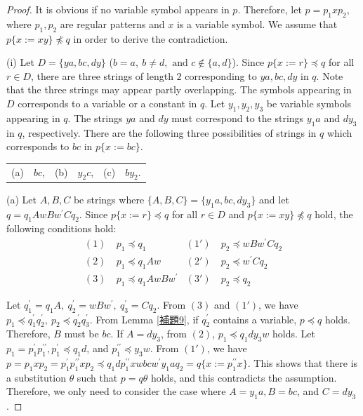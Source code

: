 \begin{proof}
  It is obvious if no variable symbol appears in $p$.
  Therefore, let $p=p_{1}xp_{2}$, where $p_{1}, p_{2}$ are regular patterns and $x$ is a variable symbol. We assume that $p \{ x := xy \} \not \preceq q$ in order to derive the contradiction.
  
\noindent\textrm{(i)}
Let $D=\{ ya, bc, dy \}$ ($b = a,~b \not= d,\mbox{~and~}c \not\in \{a,d\}$).
Since $p \{ x := r \} \preceq q$ for all $r \in D$, there are three strings of length $2$ corresponding to $ya, bc, dy$ in $q$. Note that the three strings may appear partly overlapping.
The symbols appearing in $D$ corresponds to a variable or a constant in $q$.
Let $y_{1}, y_{2}, y_{3}$ be variable symbols appearing in $q$.
The strings $ya$ and $dy$ must correspond to the strings $y_{1}a$ and $dy_{3}$ in $q$, respectively.
There are the following three possibilities of strings in $q$ which corresponds to $bc$ in $p\{x:=bc\}$.
\begin{center}
\begin{tabular}{cccccc}
\textrm{(a)} & $bc$, &
\textrm{(b)} & $y_{2}c$, &
\textrm{(c)} & $by_{2}$.
\end{tabular}
\end{center}

\textrm{(a)}
Let $A,B,C$ be strings where $\{ A,B,C \} = \{ y_{1}a,bc,dy_{3} \}$ and let $q=q_{1}AwBw^{\prime}Cq_{2}$.
Since $p \{ x := r \} \preceq q$ for all $r \in D$ and $p \{ x := xy \} \not \preceq q$ hold, the following conditions hold:
\begin{align*}
(1)~& p_{1} \preceq q_{1} & (1')~& p_{2} \preceq wBw^{\prime}Cq_{2} \\
(2)~& p_{1} \preceq q_{1}Aw & (2')~& p_{2} \preceq w^{\prime}Cq_{2} \\
(3)~& p_{1} \preceq q_{1}AwBw^{\prime} & (3')~& p_{2} \preceq q_{2}
\end{align*}

Let $q^{\prime}_{1}=q_{1}A,~q^{\prime}_{2}=wBw^{\prime},~q^{\prime}_{3}=Cq_{2}$. From $(3)$ and $(1')$, we have $p_{1} \preceq q^{\prime}_{1}q^{\prime}_{2},~p_{2} \preceq q^{\prime}_{2}q^{\prime}_{3}$.
From Lemma \ref{補題9}, if $q^{\prime}_{2}$ contains a variable, $p \preceq q$ holds.
Therefore, $B$ must be $bc$.
If $A=dy_{3}$, from $(2)$, $p_{1} \preceq q_{1}dy_{3}w$ holds.
Let $p_{1}=p^{\prime}_{1}p^{\prime\prime}_{1}, p^{\prime}_{1} \preceq q_{1}d$, and $p^{\prime\prime}_{1} \preceq y_{3}w$.
From $(1')$, we have $p=p_{1}xp_{2}=p^{\prime}_{1}p^{\prime\prime}_{1}xp_{2} \preceq q_{1}dp^{\prime\prime}_{1}xwbcw^{\prime}y_{1}aq_{2}=q \{ x:=p^{\prime\prime}_{1}x \}$. This shows that there is a substitution $\theta$ such that $p=q\theta$ holds, and this contradicts the assumption. Therefore, we only need to consider the case where $A=y_{1}a,B=bc$, and $C=dy_{3}$.


\end{proof}
